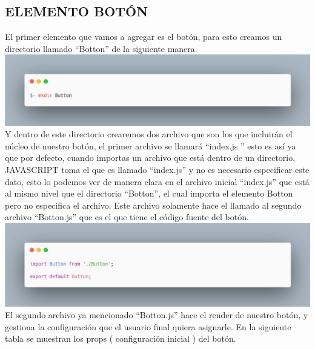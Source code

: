 \subsection{ELEMENTO BOTÓN}
El primer elemento que vamos a agregar es el botón, para esto creamos un directorio llamado “Botton” de la siguiente manera.
\newline
\newline
\includegraphics[width=1\textwidth]{./Imagenes/carbon-3.png}
\newline
\newline
Y dentro de este directorio crearemos dos archivo que son los que incluirán el núcleo de nuestro botón, el primer archivo se llamará “index.js ” esto es así ya que por defecto, cuando importas un archivo que está dentro de un directorio, JAVASCRIPT toma el que es llamado “index.js” y no es necesario especificar este dato, esto lo podemos ver de manera clara en el archivo inicial “index.js” que está al mismo nivel que el directorio “Botton”, el cual importa el elemento Botton pero no especifica el archivo. Este archivo solamente hace el llamado al segundo archivo “Botton.js” que es el que tiene el código fuente del botón. 
\newline
\newline
\includegraphics[width=1\textwidth]{./Imagenes/carbon-5.png}
\newline
\newline
El segundo archivo ya mencionado “Botton.js”  hace el render de nuestro botón, y gestiona la configuración que el usuario final quiera asignarle.
En la siguiente tabla se muestran los props ( configuración inicial  ) del botón.
\newline
\newline
